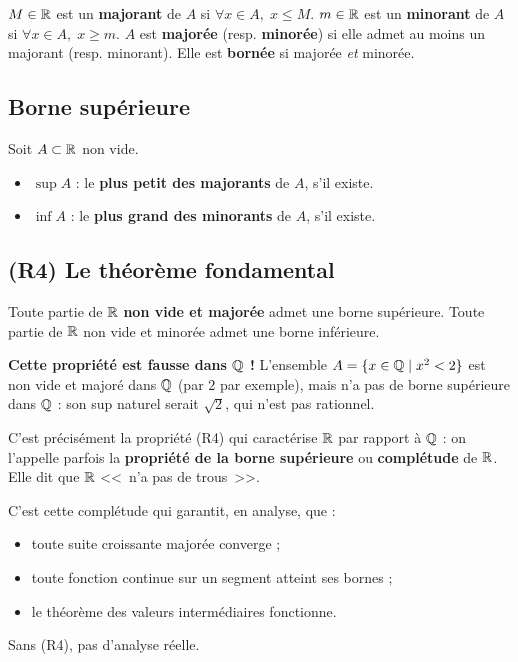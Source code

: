 \begin{defbox}
$M \in \mathbb{R}$ est un \textbf{majorant} de $A$ si $\forall x \in A,\; x \leqslant M$.
$m \in \mathbb{R}$ est un \textbf{minorant} de $A$ si $\forall x \in A,\; x \geqslant m$.
$A$ est \textbf{majorée} (resp. \textbf{minorée}) si elle admet au moins un majorant (resp. minorant). Elle est \textbf{bornée} si majorée \emph{et} minorée.
\end{defbox}

\subsection{Borne supérieure}

\begin{defbox}
Soit $A \subset \mathbb{R}$ non vide.
\begin{itemize}[leftmargin=1cm]
  \item $\sup A$ : le \textbf{plus petit des majorants} de $A$, s'il existe.
  \item $\inf A$ : le \textbf{plus grand des minorants} de $A$, s'il existe.
\end{itemize}
\end{defbox}

\subsection{(R4) Le théorème fondamental}

\begin{thmbox}
Toute partie de $\R$ \textbf{non vide et majorée} admet une borne supérieure.
Toute partie de $\R$ non vide et minorée admet une borne inférieure.
\end{thmbox}

\begin{intuitionbox}[Le saut de $\Q$ à $\R$]
\textbf{Cette propriété est fausse dans $\Q$ !} L'ensemble $A = \{ x \in \mathbb{Q} \mid x^2 < 2 \}$ est non vide et majoré dans $\Q$ (par $2$ par exemple), mais n'a pas de borne supérieure dans $\Q$ : son sup naturel serait $\sqrt{2}$, qui n'est pas rationnel.

C'est précisément la propriété (R4) qui caractérise $\R$ par rapport à $\Q$ : on l'appelle parfois la \textbf{propriété de la borne supérieure} ou \textbf{complétude} de $\R$. Elle dit que $\R$ <<~n'a pas de trous~>>.

C'est cette complétude qui garantit, en analyse, que :
\begin{itemize}[leftmargin=1cm]
  \item toute suite croissante majorée converge ;
  \item toute fonction continue sur un segment atteint ses bornes ;
  \item le théorème des valeurs intermédiaires fonctionne.
\end{itemize}
Sans (R4), pas d'analyse réelle.
\end{intuitionbox}

